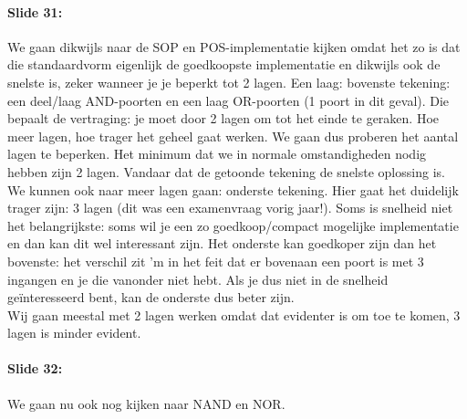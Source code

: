 \documentclass[10pt,a4paper]{book}
\begin{document}
\paragraph{Slide 31:} We gaan dikwijls naar de SOP en POS-implementatie kijken omdat het zo is dat die standaardvorm eigenlijk de goedkoopste implementatie en dikwijls ook de snelste is, zeker wanneer je je beperkt tot 2 lagen. Een laag: bovenste tekening: een deel/laag AND-poorten en een laag OR-poorten (1 poort in dit geval). Die bepaalt de vertraging: je moet door 2 lagen om tot het einde te geraken. Hoe meer lagen, hoe trager het geheel gaat werken. We gaan dus proberen het aantal lagen te beperken. Het minimum dat we in normale omstandigheden nodig hebben zijn 2 lagen. Vandaar dat de getoonde tekening de snelste oplossing is.\\
We kunnen ook naar meer lagen gaan: onderste tekening. Hier gaat het duidelijk trager zijn: 3 lagen (dit was een examenvraag vorig jaar!). Soms is snelheid niet het belangrijkste: soms wil je een zo goedkoop/compact mogelijke implementatie en dan kan dit wel interessant zijn. Het onderste kan goedkoper zijn dan het bovenste: het verschil zit 'm in het feit dat er bovenaan een poort is met 3 ingangen en je die vanonder niet hebt. Als je dus niet in de snelheid ge\"interesseerd bent, kan de onderste dus beter zijn.\\
Wij gaan meestal met 2 lagen werken omdat dat evidenter is om toe te komen, 3 lagen is minder evident. 

\paragraph{Slide 32:} We gaan nu ook nog kijken naar NAND en NOR.
\end{document}
